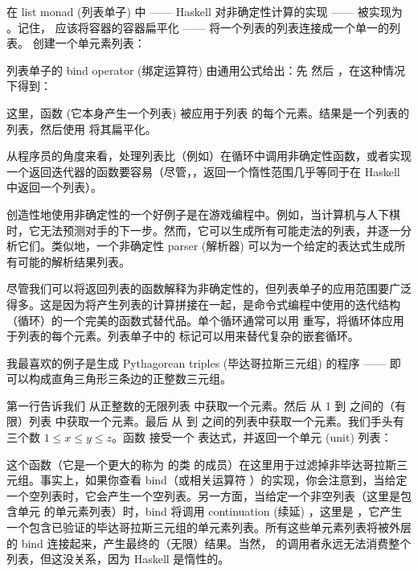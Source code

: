 在 list monad (列表单子) 中 —— Haskell 对非确定性计算的实现 ——  被实现为 。记住， 应该将容器的容器扁平化 ——  将一个列表的列表连接成一个单一的列表。 创建一个单元素列表：

列表单子的 bind operator (绑定运算符) 由通用公式给出：先  然后 ，在这种情况下得到：

这里，函数  (它本身产生一个列表) 被应用于列表  的每个元素。结果是一个列表的列表，然后使用  将其扁平化。

从程序员的角度来看，处理列表比（例如）在循环中调用非确定性函数，或者实现一个返回迭代器的函数要容易（尽管，，返回一个惰性范围几乎等同于在 Haskell 中返回一个列表）。

创造性地使用非确定性的一个好例子是在游戏编程中。例如，当计算机与人下棋时，它无法预测对手的下一步。然而，它可以生成所有可能走法的列表，并逐一分析它们。类似地，一个非确定性 parser (解析器) 可以为一个给定的表达式生成所有可能的解析结果列表。

尽管我们可以将返回列表的函数解释为非确定性的，但列表单子的应用范围要广泛得多。这是因为将产生列表的计算拼接在一起，是命令式编程中使用的迭代结构（循环）的一个完美的函数式替代品。单个循环通常可以用  重写，将循环体应用于列表的每个元素。列表单子中的  标记可以用来替代复杂的嵌套循环。

我最喜欢的例子是生成 Pythagorean triples (毕达哥拉斯三元组) 的程序 —— 即可以构成直角三角形三条边的正整数三元组。

第一行告诉我们  从正整数的无限列表 \code{{[}1..{]}} 中获取一个元素。然后  从 1 到  之间的（有限）列表 \code{{[}1..z{]}} 中获取一个元素。最后  从  到  之间的列表中获取一个元素。我们手头有三个数 $1 \leqslant x \leqslant y \leqslant z$。函数  接受一个  表达式，并返回一个单元 (unit) 列表：

这个函数（它是一个更大的称为  的类 的成员）在这里用于过滤掉非毕达哥拉斯三元组。事实上，如果你查看 bind（或相关运算符 \code{>>}）的实现，你会注意到，当给定一个空列表时，它会产生一个空列表。另一方面，当给定一个非空列表（这里是包含单元 \code{{[}(){]}} 的单元素列表）时，bind 将调用 continuation (续延) ，这里是 ，它产生一个包含已验证的毕达哥拉斯三元组的单元素列表。所有这些单元素列表将被外层的 bind 连接起来，产生最终的（无限）结果。当然， 的调用者永远无法消费整个列表，但这没关系，因为 Haskell 是惰性的。

